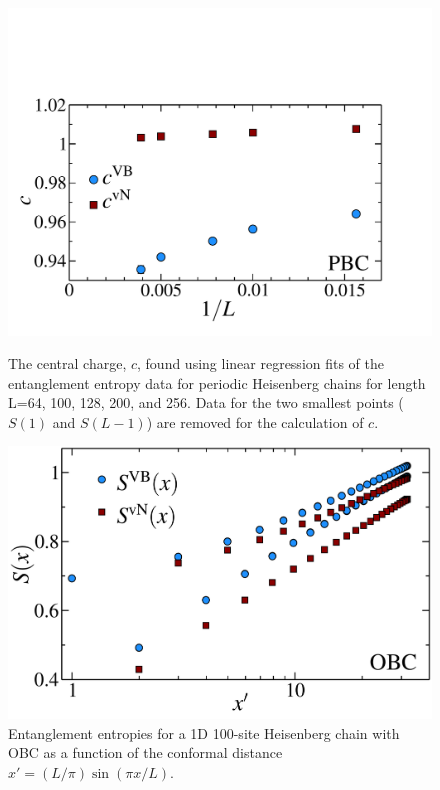 \begin{figure} 
\vspace{-4cm}
\hspace{3mm}
\includegraphics[width=6in]{./figures/paper1/figure1/thesis_c1.pdf} 
\vspace{-4mm}
	\caption[Values of the conformal charge from the 1D periodic boundary results]{
	The central charge, $c$, found using linear regression fits of the entanglement entropy data 	for periodic Heisenberg chains for length L=64, 100, 128, 200, and 256.  Data for the two smallest 	points ($S(1)$ and $S(L-1)$) are removed for the calculation of $c$.
	\label{c1}}
\vspace{1cm}
\hspace{1cm}
\includegraphics[width=5.1in]{./figures/paper1/figure1/thesis_obc.pdf} 
\caption[1D Results for \vb and \vn using open boundaries]{
	Entanglement entropies for a 1D 100-site Heisenberg chain with OBC as a function of the conformal distance $x'  = (L/\pi)\sin (\pi x/L)$.
	\label{1dOBC}}
\end{figure}


